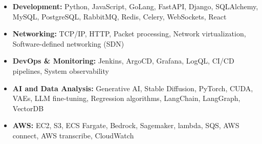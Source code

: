 
\begin{cvskills}

\setlength{\leftmargini}{1em}
\begin{itemize}
    \item \textbf{Development:} Python, JavaScript, GoLang, FastAPI, Django, SQLAlchemy, MySQL, PostgreSQL, RabbitMQ, Redis, Celery, WebSockets, React
    \item \textbf{Networking:} TCP/IP, HTTP, Packet processing, Network virtualization, Software-defined networking (SDN)
    \item \textbf{DevOps \& Monitoring:} Jenkins, ArgoCD, Grafana, LogQL, CI/CD pipelines, System observability
    \item \textbf{AI and Data Analysis:} Generative AI, Stable Diffusion, PyTorch, CUDA, VAEs, LLM fine-tuning, Regression algorithms, LangChain, LangGraph, VectorDB
    \item \textbf{AWS:} EC2, S3, ECS Fargate, Bedrock, Sagemaker, lambda, SQS, AWS connect, AWS transcribe, CloudWatch
\end{itemize}

\end{cvskills}
